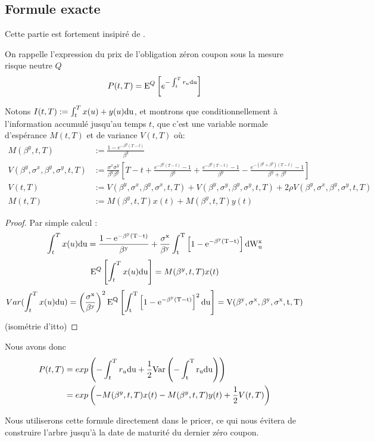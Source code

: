 \subsection{Formule exacte}
Cette partie est fortement insipiré de \cite{Brugo}.

On rappelle l'expression du prix de l'obligation zéron coupon sous la mesure risque neutre $Q$
$$P(t, T) = \mathrm{E}^Q \left[  e^{-\int_t^T r_u \rm{d}u} \right] $$

Notons $I(t, T) := \int_t^T x(u) + y(u) \rm{d}u$, et montrons que conditionnellement à l'information accumulé jusqu'au temps $t$, que c'est une variable normale d'espérance $M(t, T)$ et de variance $V(t, T)$ où:
\begin{align}
  M(\beta^y, t, T) &:= \frac{1 - e^{-\beta^y (T-t) }}{\beta^y} \\
  V(\beta^y, \sigma^x, \beta^y, \sigma^y, t, T) &:= \frac{\sigma^x \sigma^y}{\beta^y \beta^y} \left[ T - t + \frac{e^{-\beta^y (T-t) } - 1}{\beta^y} + \frac{e^{-\beta^y (T-t) } - 1}{\beta^y} - \frac{e^{-(\beta^y + \beta^y) (T-t) } - 1}{\beta^y + \beta^y} \right] \\
  V(t, T) &:= V(\beta^y, \sigma^x, \beta^y, \sigma^x, t, T)
            + V(\beta^y, \sigma^y, \beta^y, \sigma^y, t, T)
            + 2 \rho V(\beta^y, \sigma^x, \beta^y, \sigma^y, t, T) \\
            M(t, T) &:= M(\beta^y, t, T) x(t) + M(\beta^y, t, T) y(t)
\end{align}

\begin{proof}
  Par simple calcul \cite{Brugo}:
  $$  \int_t^T x(u) \rm{d}u = \frac{1 - e^{-\beta^y (T-t)}}{\beta^y} + \frac{\sigma^x}{\beta^y} \int_t^T \left[1 - e^{-\beta^y (T-t)}\right] \rm{d} W^x_u$$
  $$  \mathrm{E}^Q \left[ \int_t^T x(u) \rm{d}u \right] = M(\beta^y, t, T) x(t)$$
  $$ Var(\int_t^T x(u) \rm{d}u) =   \left(\frac{\sigma^x}{\beta^y}\right)^2 \mathrm{E}^Q \left[  \int_t^T \left[1 - e^{-\beta^y (T-t)}\right]^2 \rm{d}u  \right] = V(\beta^y, \sigma^x, \beta^y, \sigma^x, t, T)$$ (isométrie d'itto)
\end{proof}

Nous avons donc
\begin{align}
  P(t, T) &= exp  \left(  -\int_t^T r_u \rm{d}u + \frac{1}{2} Var \left( {-\int_t^T r_u \rm{d}u} \right)  \right) \\
          &= exp  \left( - M(\beta^y, t, T) x(t) - M(\beta^y, t, T) y(t) + \frac{1}{2} V(t, T) \right)
  \end{align}

Nous utiliserons cette formule directement dans le pricer, ce qui nous évitera de construire l'arbre jusqu'à la date de maturité du dernier zéro coupon.

